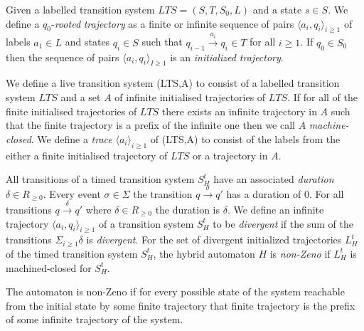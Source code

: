 \medskip
\begin{mydef}
Given a labelled transition system $LTS = (S,T,S_0,L)$ and a state $s \in S$. We define a $q_0$-\emph{rooted} \emph{trajectory} as a finite or infinite sequence of pairs $\langle a_i, q_i \rangle_{i \geq 1}$ of labels $a_1 \in L$ and states $q_i \in S$  such that $q_{i-1} \xrightarrow{a_i} q_{i} \in T$ for all $i \geq 1$. If $q_0 \in S_0$ then the sequence of pairs $\langle a_i, q_i \rangle_{I \geq 1}$ is an \emph{initialized trajectory}. 
\end{mydef}
\medskip
\begin{mydef}
We define a live transition system (LTS,A) to consist of a labelled transition system $LTS$ and a set $A$ of infinite initialised trajectories of $LTS$. If for all of the finite initialised trajectories of $LTS$ there exists an infinite trajectory in $A$ such that the finite trajectory is a prefix of the infinite one then we call $A$ \emph{machine-closed}. We define a \emph{trace} $\langle a_i \rangle_{i \geq 1}$ of (LTS,A) to consist of the labels from the either a finite initialised trajectory of $LTS$ or a trajectory in $A$.
\end{mydef}
\medskip


\begin{mydef}
All transitions of a timed transition system $S^t_H$ have an associated \emph{duration} $\delta \in R_{\geq 0}$. Every event $\sigma \in \Sigma$ the transition $q \xrightarrow{\sigma} q'$ has a duration of 0. For all transitions $q \xrightarrow{\delta} q'$ where $\delta \in R_{\geq 0}$ the duration is $\delta$.  We define an infinite trajectory $\langle a_i, q_i \rangle_{i \geq 1}$ of a transition system $S^t_H$ to be \emph{divergent} if the sum of the transitions $\Sigma_{i \geq 1} \delta$ is \emph{divergent}. For the set of divergent initialized trajectories $L^t_H$ of the timed transition system $S^t_H$, the hybrid automaton $H$ is \emph{non-Zeno} if $L^t_H$ is machined-closed for $S^t_H$.
 \end{mydef}

The automaton is non-Zeno if for every possible state of the system reachable from the initial state by some finite trajectory that finite trajectory is the prefix of some infinite trajectory of the system.

